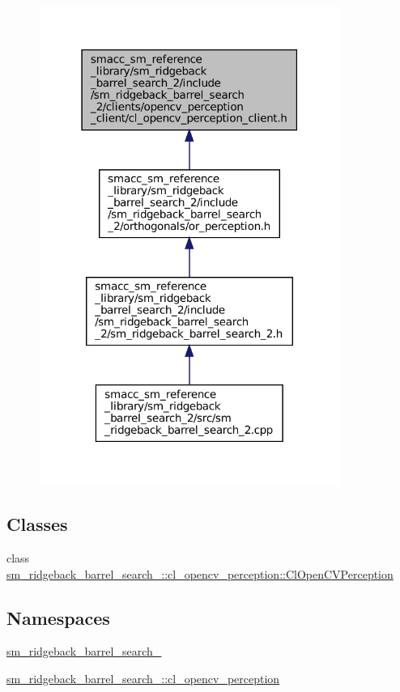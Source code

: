 \begin{figure}[H]
\begin{center}
\leavevmode
\includegraphics[width=279pt]{sm__ridgeback__barrel__search__2_2include_2sm__ridgeback__barrel__search__2_2clients_2opencv__pe57e232889ab09c18b995d8ef64d8272f}
\end{center}
\end{figure}
\subsection*{Classes}
\begin{DoxyCompactItemize}
\item 
class \hyperlink{classsm__ridgeback__barrel__search__2_1_1cl__opencv__perception_1_1ClOpenCVPerception}{sm\+\_\+ridgeback\+\_\+barrel\+\_\+search\+\_\+::cl\+\_\+opencv\+\_\+perception\+::\+Cl\+Open\+C\+V\+Perception}
\end{DoxyCompactItemize}
\subsection*{Namespaces}
\begin{DoxyCompactItemize}
\item 
 \hyperlink{namespacesm__ridgeback__barrel__search__2}{sm\+\_\+ridgeback\+\_\+barrel\+\_\+search\+\_}
\item 
 \hyperlink{namespacesm__ridgeback__barrel__search__2_1_1cl__opencv__perception}{sm\+\_\+ridgeback\+\_\+barrel\+\_\+search\+\_\+::cl\+\_\+opencv\+\_\+perception}
\end{DoxyCompactItemize}
